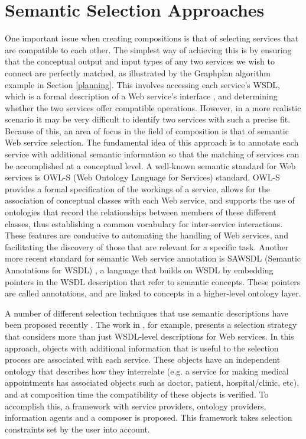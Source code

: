 \section{Semantic Selection Approaches}\label{semantic}
One important issue when creating compositions is that of selecting services that are compatible to each other. The simplest way of achieving this is by ensuring that the conceptual output and input types of any two services we wish to connect are perfectly matched, as illustrated by the Graphplan algorithm example in Section \ref{planning}. This involves accessing each service's WSDL, which is a formal description of a Web service's interface \cite{curbera2002unraveling}, and determining whether the two services offer compatible operations. However, in a more realistic scenario it may be very difficult to identify two services with such a precise fit. Because of this, an area of focus in the field of composition is that of semantic Web service selection. The fundamental idea of this approach is to annotate each service with additional semantic information so that the matching of services can be accomplished at a conceptual level. A well-known semantic standard for Web services is OWL-S (Web Ontology Language for Services) \cite{martin2007bringing} standard. OWL-S provides a formal specification of the workings of a service, allows for the association of conceptual classes with each Web service, and supports the use of ontologies that record the relationships between members of these different classes, thus establishing a common vocabulary for inter-service interactions. These features are conducive to automating the handling of Web services, and facilitating the discovery of those that are relevant for a specific task. Another more recent standard for semantic Web service annotation is SAWSDL (Semantic Annotations for WSDL) \cite{kopecky2007sawsdl}, a language that builds on WSDL by embedding pointers in the WSDL description that refer to semantic concepts. These pointers are called annotations, and are linked to concepts in a higher-level ontology layer.

A number of different selection techniques that use semantic descriptions have been proposed recently \cite{soydan2004daml,wang2006qos,garcia2008qos,lin2008web,karakoc2009composing,boustil2010web,saboohi2011world,li2013towards,zhang2013genetic}. The work in \cite{DBLP:journals/soca/BoustilMS14}, for example, presents a selection strategy that considers more than just WSDL-level descriptions for Web services. In this approach, objects with additional information that is useful to the selection process are associated with each service. These objects have an independent ontology that describes how they interrelate (e.g. a service for making medical appointments has associated objects such as doctor, patient, hospital/clinic, etc), and at composition time the compatibility of these objects is verified. To accomplish this, a framework with service providers, ontology providers, information agents and a composer is proposed. This framework takes selection constraints set by the user into account.

